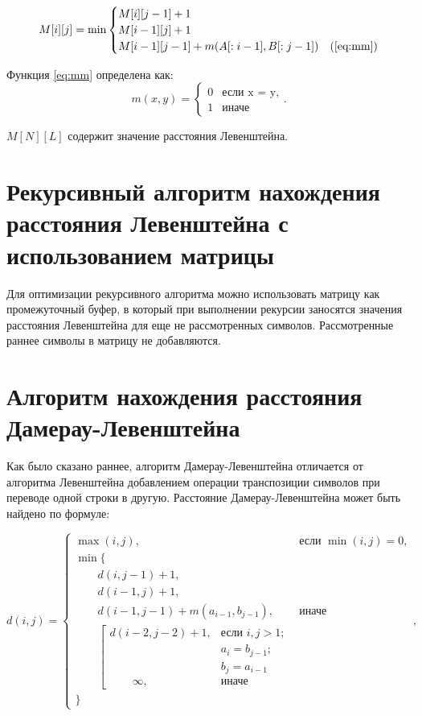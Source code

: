 \begin{equation}
	\label{eq:mL}
	M[i][j] = \min
		\begin{cases}
		M[i][j-1] + 1\\
		M[i-1][j] + 1\\
		M[i-1][j-1] + m(A[:i-1], B[:j-1]) &\text(\ref{eq:mm})\\
	\end{cases}
\end{equation}

Функция \ref{eq:mm} определена как:
\begin{equation}
	\label{eq:mm}
	m(x, y) = \begin{cases}
		0 &\text{если x = y,}\\
		1 &\text{иначе}
	\end{cases}.
\end{equation}

$M[N][L]$ содержит значение расстояния Левенштейна.

\section{Рекурсивный алгоритм нахождения расстояния Левенштейна с использованием матрицы}

Для оптимизации рекурсивного алгоритма можно использовать матрицу как промежуточный буфер, в который при выполнении рекурсии заносятся значения расстояния Левенштейна для еще не рассмотренных символов. Рассмотренные раннее символы в матрицу не добавляются.

\section{Алгоритм нахождения расстояния Дамерау-Левенштейна}

Как было сказано раннее, алгоритм Дамерау-Левенштейна отличается от алгоритма Левенштейна добавлением операции транспозиции символов при переводе одной строки в другую. Расстояние Дамерау-Левенштейна может быть найдено по формуле:

\begin{equation}
	\label{eq:DL}
	d(i, j) = \begin{cases}
		\max(i, j), &\text{если }\min(i, j) = 0,\\
		\min \lbrace \\
			\qquad d(i, j-1) + 1,\\
			\qquad d(i-1, j) + 1,\\
			\qquad d(i-1, j-1) + m(a_{i-1}, b_{j-1}), &\text{иначе}\\
			\qquad \left[ \begin{array}{cc}d(i-2, j-2) + 1, &\text{если }i,j > 1;\\
			\qquad &\text{}a_{i} = b_{j-1}; \\
			\qquad &\text{}b_{j} = a_{i-1}\\
			\qquad \infty, & \text{иначе}\end{array}\right.\\
		\rbrace
		\end{cases},
\end{equation}

